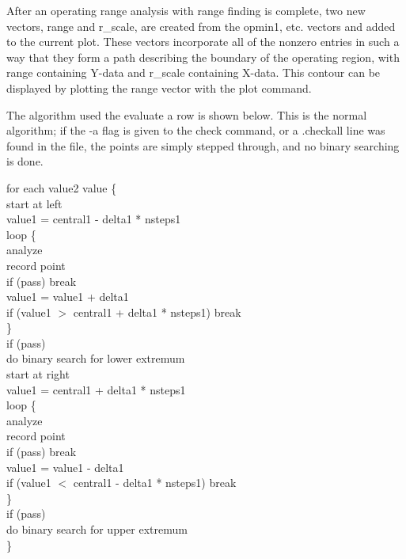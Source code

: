 After an operating range analysis with range finding is complete, two
new vectors, {\et range} and {\et r\_scale}, are created from the {\et
opmin1}, etc. vectors and added to the current plot.  These vectors
incorporate all of the nonzero entries in such a way that they form a
path describing the boundary of the operating region, with {\et range}
containing Y-data and {\et r\_scale} containing X-data.  This contour
can be displayed by plotting the {\et range} vector with the {\cb
plot} command.

The algorithm used the evaluate a row is shown below.  This is the
normal algorithm; if the {\vt -a} flag is given to the {\cb check}
command, or a {\vt .checkall} line was found in the file, the points
are simply stepped through, and no binary searching is done.

{\raggedright
\qquad for each value2 value \{\\
\qquad\qquad start at left\\
\qquad\qquad value1 = central1 - delta1 * nsteps1\\
\qquad\qquad loop \{\\
\qquad\qquad\qquad analyze\\
\qquad\qquad\qquad record point\\
\qquad\qquad\qquad if (pass) break\\
\qquad\qquad\qquad value1 = value1 + delta1\\
\qquad\qquad\qquad if (value1 $>$ central1 + delta1 * nsteps1) break\\
\qquad\qquad \}\\
\qquad\qquad if (pass)\\
\qquad\qquad\qquad do binary search for lower extremum\\[2ex]
\qquad\qquad start at right\\
\qquad\qquad value1 = central1 + delta1 * nsteps1\\
\qquad\qquad loop \{\\
\qquad\qquad\qquad analyze\\
\qquad\qquad\qquad record point\\
\qquad\qquad\qquad if (pass) break\\
\qquad\qquad\qquad value1 = value1 - delta1\\
\qquad\qquad\qquad if (value1 $<$ central1 - delta1 * nsteps1) break\\
\qquad\qquad \}\\
\qquad\qquad if (pass)\\
\qquad\qquad\qquad do binary search for upper extremum\\
\qquad \}\\[2ex]}


